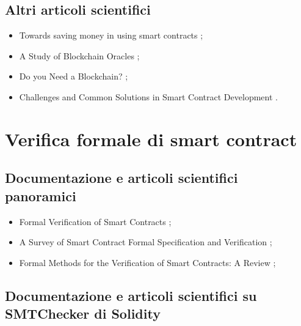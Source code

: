 \subsection*{Altri articoli scientifici}
\begin{itemize}

\item Towards saving money in using smart contracts \cite{chen2018gas};

\item A Study of Blockchain Oracles \cite{beniiche2020oracle};

\item Do you Need a Blockchain? \cite{wurst2018blockchain};

\item Challenges and Common Solutions in Smart Contract Development \cite{kannengiesser2022challanges}.

\end{itemize}

\section*{Verifica formale di smart contract}

\subsection*{Documentazione e articoli scientifici panoramici}

\begin{itemize}

\item Formal Verification of Smart Contracts \cite{ethereum2024scfv};

\item A Survey of Smart Contract Formal Specification and Verification \cite{tolmach2021scfsvsurvey};

\item Formal Methods for the Verification of Smart Contracts: A Review \cite{krichen2022scfmvreview};

\end{itemize}

\subsection*{Documentazione e articoli scientifici su SMTChecker di Solidity}

